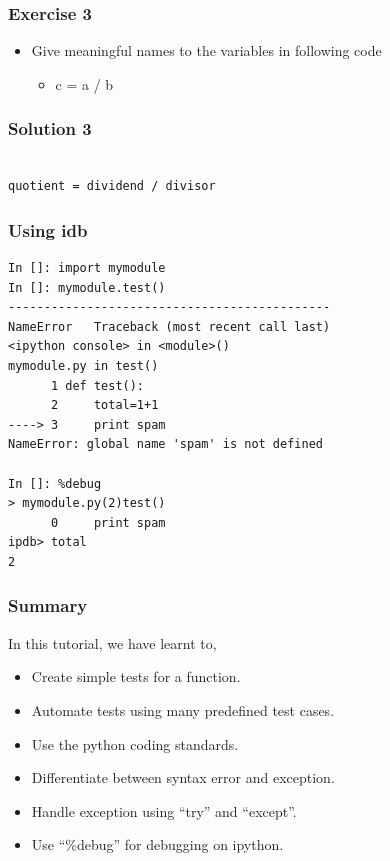 \documentclass[presentation]{beamer}
\begin{document}
\begin{frame}
\frametitle{Exercise 3}
\label{sec-14}


\begin{itemize}
\item Give meaningful names to the variables in following
     code
\begin{itemize}
\item c = a / b
\end{itemize}
\end{itemize}
\end{frame}
\begin{frame}[fragile]
\frametitle{Solution 3}
\label{sec-15}

\lstset{language=Python}
\begin{lstlisting}

quotient = dividend / divisor
\end{lstlisting}
\end{frame}
\begin{frame}[fragile]
\frametitle{Using idb}
\label{sec-16}

\small
\begin{lstlisting}
In []: import mymodule
In []: mymodule.test()
---------------------------------------------
NameError   Traceback (most recent call last)
<ipython console> in <module>()
mymodule.py in test()
      1 def test():
      2     total=1+1
----> 3     print spam
NameError: global name 'spam' is not defined

In []: %debug
> mymodule.py(2)test()
      0     print spam
ipdb> total
2
\end{lstlisting}
\end{frame}
\begin{frame}
\frametitle{Summary}
\label{sec-17}

 In this tutorial, we have learnt to, 
        

\begin{itemize}
\item Create simple tests for a function.
\item Automate tests using many predefined test cases.
\item Use the python coding standards.
\item Differentiate between syntax error and exception.
\item Handle exception using ``try'' and ``except''.
\item Use ``\%debug'' for debugging on ipython.
\end{itemize}
\end{frame}
\end{document}
